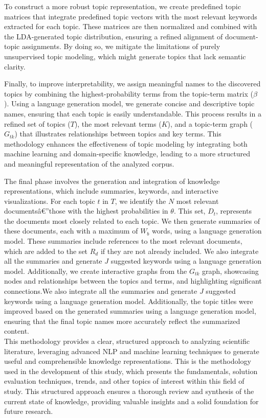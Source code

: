 \documentclass[runningheads]{llncs}
\begin{document}
To construct a more robust topic representation, we create predefined topic matrices that integrate predefined topic vectors with the most relevant keywords extracted for each topic. These matrices are then normalized and combined with the LDA-generated topic distribution, ensuring a refined alignment of document-topic assignments. By doing so, we mitigate the limitations of purely unsupervised topic modeling, which might generate topics that lack semantic clarity.

Finally, to improve interpretability, we assign meaningful names to the discovered topics by combining the highest-probability terms from the topic-term matrix ($\beta$). Using a language generation model, we generate concise and descriptive topic names, ensuring that each topic is easily understandable. This process results in a refined set of topics ($T$), the most relevant terms ($K$), and a topic-term graph ($G_{tk}$) that illustrates relationships between topics and key terms. This methodology enhances the effectiveness of topic modeling by integrating both machine learning and domain-specific knowledge, leading to a more structured and meaningful representation of the analyzed corpus.

The final phase involves the generation and integration of knowledge representations, which include summaries, keywords, and interactive visualizations. For each topic $t$ in $T$, we identify the $N$ most relevant documentsâ€”those with the highest probabilities in $\theta$. This set, $D_t$, represents the documents most closely related to each topic. We then generate summaries of these documents, each with a maximum of $W_b$ words, using a language generation model. These summaries include references to the most relevant documents, which are added to the set $R_d$ if they are not already included. We also integrate all the summaries and generate $J$ suggested keywords using a language generation model. Additionally, we create interactive graphs from the $G_{tk}$ graph, showcasing nodes and relationships between the topics and terms, and highlighting significant connections.We also integrate all the summaries and generate $J$ suggested keywords using a language generation model. Additionally, the topic titles were improved based on the generated summaries using a language generation model, ensuring that the final topic names more accurately reflect the summarized content.
\\

This methodology provides a clear, structured approach to analyzing scientific literature, leveraging advanced NLP and machine learning techniques to generate useful and comprehensible knowledge representations. This is the methodology used in the development of this study, which presents the fundamentals, solution evaluation techniques, trends, and other topics of interest within this field of study. This structured approach ensures a thorough review and synthesis of the current state of knowledge, providing valuable insights and a solid foundation for future research.
\end{document}
